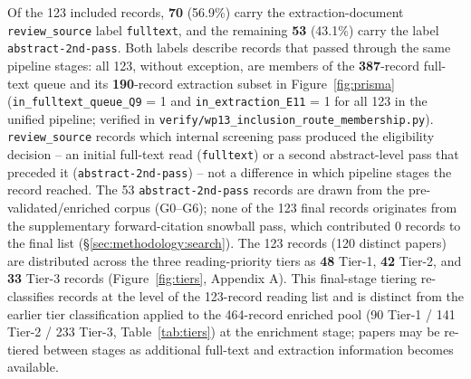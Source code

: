 Of the 123 included records, \textbf{70} (56.9\%) carry the extraction-document
\texttt{review\_source} label \texttt{fulltext}, and the remaining \textbf{53}
(43.1\%) carry the label \texttt{abstract-2nd-pass}. Both labels describe
records that passed through the same pipeline stages: all 123, without
exception, are members of the \textbf{387}-record full-text queue and its
\textbf{190}-record extraction subset in Figure~\ref{fig:prisma}
(\texttt{in\_fulltext\_queue\_Q9} = 1 and \texttt{in\_extraction\_E11} = 1 for
all 123 in the unified pipeline; verified in
\texttt{verify/wp13\_inclusion\_route\_membership.py}). \texttt{review\_source}
records which internal screening pass produced the eligibility decision --
an initial full-text read (\texttt{fulltext}) or a second abstract-level
pass that preceded it (\texttt{abstract-2nd-pass}) -- not a difference in
which pipeline stages the record reached. The 53 \texttt{abstract-2nd-pass}
records are drawn from the pre-validated/enriched corpus (G0--G6); none of
the 123 final records originates from the supplementary forward-citation
snowball pass, which contributed 0 records to the final list
(\S\ref{sec:methodology:search}). The
123 records (120 distinct papers) are distributed across the three
reading-priority tiers as \textbf{48} Tier-1, \textbf{42} Tier-2, and
\textbf{33} Tier-3 records (Figure~\ref{fig:tiers}, Appendix A). This
final-stage tiering re-classifies records at the level of the 123-record
reading list and is distinct from the earlier tier classification applied to
the 464-record enriched pool (90 Tier-1 / 141 Tier-2 / 233 Tier-3,
Table~\ref{tab:tiers}) at the enrichment stage;
papers may be re-tiered between stages as additional full-text and extraction
information becomes available.

